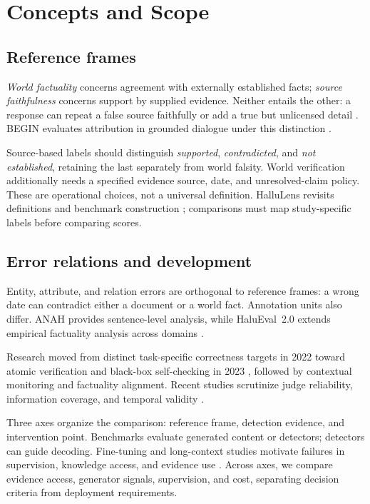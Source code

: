 \section{Concepts and Scope}\label{sec:background}
\subsection{Reference frames}
\emph{World factuality} concerns agreement with externally established facts; \emph{source faithfulness} concerns support by supplied evidence. Neither entails the other: a response can repeat a false source faithfully or add a true but unlicensed detail \citep{cao-etal-2022-hallucinated,adlakha-etal-2024-evaluating}. BEGIN evaluates attribution in grounded dialogue under this distinction \citep{dziri-etal-2022-evaluating}.

Source-based labels should distinguish \emph{supported}, \emph{contradicted}, and \emph{not established}, retaining the last separately from world falsity. World verification additionally needs a specified evidence source, date, and unresolved-claim policy. These are operational choices, not a universal definition. HalluLens revisits definitions and benchmark construction \citep{bang-etal-2025-hallulens}; comparisons must map study-specific labels before comparing scores.

\subsection{Error relations and development}
Entity, attribute, and relation errors are orthogonal to reference frames: a wrong date can contradict either a document or a world fact. Annotation units also differ. ANAH provides sentence-level analysis, while HaluEval~2.0 extends empirical factuality analysis across domains \citep{ji-etal-2024-anah,li-etal-2024-dawn}.

Research moved from distinct task-specific correctness targets in 2022 toward atomic verification and black-box self-checking in 2023 \citep{min-etal-2023-factscore,manakul-etal-2023-selfcheckgpt}, followed by contextual monitoring and factuality alignment. Recent studies scrutinize judge reliability, information coverage, and temporal validity \citep{godbole-jia-2025-verify,samarinas-etal-2025-beyond,jiang-etal-2026-benchmarks}.

Three axes organize the comparison: reference frame, detection evidence, and intervention point. Benchmarks evaluate generated content or detectors; detectors can guide decoding. Fine-tuning and long-context studies motivate failures in supervision, knowledge access, and evidence use \citep{gekhman-etal-2024-fine,liu-etal-2024-lost}. Across axes, we compare evidence access, generator signals, supervision, and cost, separating decision criteria from deployment requirements.
